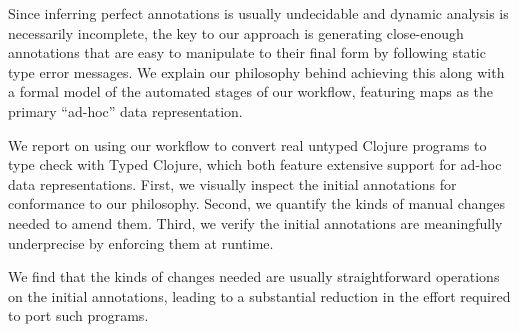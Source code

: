 Since inferring perfect annotations is usually undecidable
and dynamic analysis is necessarily incomplete,
the key to our approach is generating close-enough annotations
that are easy to manipulate to their final form by following static type error
messages.
We explain our philosophy behind achieving this
along with a formal model of the automated stages of our workflow,
featuring maps as the primary ``ad-hoc'' data representation.

We report on using our workflow to convert real untyped Clojure programs to type check with Typed Clojure,
which both feature extensive support for ad-hoc data representations.
First, we visually inspect the initial annotations for conformance to our philosophy.
Second, we quantify the kinds of manual changes needed to amend them.
Third, we verify the initial annotations are meaningfully underprecise by enforcing them at runtime.

We find that the kinds of changes needed are
usually straightforward operations on the initial annotations,
leading to a substantial reduction in the effort required to port such programs.






